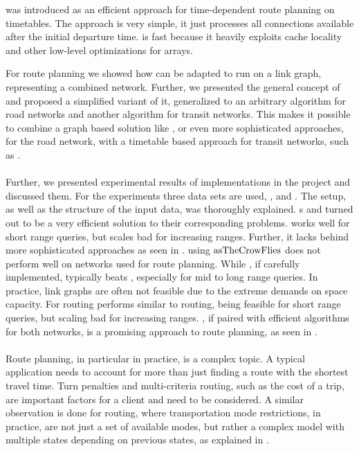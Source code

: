 	\csa was introduced as an efficient approach for time-dependent route planning on timetables. The approach is very simple, it just processes all connections
	available after the initial departure time. \csa is fast because it heavily exploits cache locality  and other low-level optimizations
	for arrays.
	
	For \multiModal route planning we showed how \dijkstra can be adapted to run on a link graph, representing a combined network. Further, we presented the
	general concept of \anr and proposed a simplified variant of it, generalized to an arbitrary algorithm for road networks and another algorithm for transit
	networks. This makes it possible to combine a graph based solution like \dijkstra, or even more sophisticated approaches, for the road network,
	with a timetable based approach for transit networks, such as \csa.\\\\
	Further, we presented experimental results of implementations in the \cobweb project  and discussed them.
	For the experiments three data sets are used, \freiburgR, \stuttgartR and \switzerlandR.
	The setup, as well as the structure of the input data, was thoroughly explained. {\coverTree}s and \csa turned out to be a very
	efficient solution to their corresponding problems. \dijkstra works well for short range queries,
	but scales bad for increasing ranges. Further, it lacks behind more sophisticated approaches as seen in .
	\astar using $\operatorname{asTheCrowFlies}$ does not perform well on networks used for route planning. While \alt, if carefully implemented, typically beats \dijkstra,
	especially for mid to long range queries. In practice, link graphs are often not feasible due to the extreme demands on space capacity. For \multiModal routing
	\dijkstra performs similar to \uniModal routing, being feasible for short range queries, but scaling bad for increasing ranges. \anr, if paired with efficient algorithms
	for both networks, is a promising approach to \multiModal route planning, as seen in .\\\\
	Route planning, in particular in practice, is a complex topic. A typical application needs to account for more than just finding a route with the shortest travel time.
	Turn penalties and multi-criteria routing, such as the cost of a trip, are important factors for a client and need to be considered. A similar observation is done
	for \multiModal routing, where transportation mode restrictions, in practice, are not just a set of available modes, but rather a complex model with
	multiple states depending on previous states, as explained in .
	

